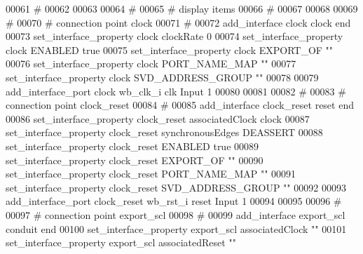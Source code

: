 \begin{DoxyCode}
00061 \textcolor{comment}{}\textcolor{comment}{# }
00062 \textcolor{comment}{}
00063 
00064 \textcolor{comment}{# }
00065 \textcolor{comment}{}\textcolor{comment}{# display items}
00066 \textcolor{comment}{}\textcolor{comment}{# }
00067 \textcolor{comment}{}
00068 
00069 \textcolor{comment}{# }
00070 \textcolor{comment}{}\textcolor{comment}{# connection point clock}
00071 \textcolor{comment}{}\textcolor{comment}{# }
00072 \textcolor{comment}{}add\_interface clock clock end\textcolor{comment}{}
00073 \textcolor{comment}{}set\_interface\_property clock clockRate 0\textcolor{comment}{}
00074 \textcolor{comment}{}set\_interface\_property clock ENABLED true\textcolor{comment}{}
00075 \textcolor{comment}{}set\_interface\_property clock EXPORT\_OF ""\textcolor{comment}{}
00076 \textcolor{comment}{}set\_interface\_property clock PORT\_NAME\_MAP ""\textcolor{comment}{}
00077 \textcolor{comment}{}set\_interface\_property clock SVD\_ADDRESS\_GROUP ""\textcolor{comment}{}
00078 \textcolor{comment}{}
00079 add\_interface\_port clock wb\_clk\_i clk Input 1\textcolor{comment}{}
00080 \textcolor{comment}{}
00081 
00082 \textcolor{comment}{# }
00083 \textcolor{comment}{}\textcolor{comment}{# connection point clock\_reset}
00084 \textcolor{comment}{}\textcolor{comment}{# }
00085 \textcolor{comment}{}add\_interface clock\_reset reset end\textcolor{comment}{}
00086 \textcolor{comment}{}set\_interface\_property clock\_reset associatedClock clock\textcolor{comment}{}
00087 \textcolor{comment}{}set\_interface\_property clock\_reset synchronousEdges DEASSERT\textcolor{comment}{}
00088 \textcolor{comment}{}set\_interface\_property clock\_reset ENABLED true\textcolor{comment}{}
00089 \textcolor{comment}{}set\_interface\_property clock\_reset EXPORT\_OF ""\textcolor{comment}{}
00090 \textcolor{comment}{}set\_interface\_property clock\_reset PORT\_NAME\_MAP ""\textcolor{comment}{}
00091 \textcolor{comment}{}set\_interface\_property clock\_reset SVD\_ADDRESS\_GROUP ""\textcolor{comment}{}
00092 \textcolor{comment}{}
00093 add\_interface\_port clock\_reset wb\_rst\_i reset Input 1\textcolor{comment}{}
00094 \textcolor{comment}{}
00095 
00096   \textcolor{comment}{# }
00097 \textcolor{comment}{}\textcolor{comment}{  }\textcolor{comment}{# connection point export\_scl}
00098 \textcolor{comment}{}\textcolor{comment}{  }\textcolor{comment}{# }
00099 \textcolor{comment}{}\textcolor{comment}{  }add\_interface export\_scl conduit end\textcolor{comment}{}
00100 \textcolor{comment}{}  set\_interface\_property export\_scl associatedClock ""\textcolor{comment}{}
00101 \textcolor{comment}{}  set\_interface\_property export\_scl associatedReset ""\textcolor{comment}{}

\end{DoxyCode}
